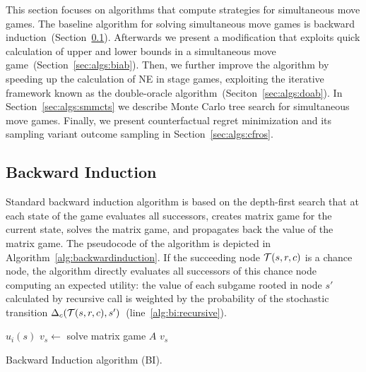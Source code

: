 
This section focuses on algorithms that compute strategies for simultaneous move games. 
The baseline algorithm for solving simultaneous move games is backward induction~(Section~\ref{sec:algs:bi}).
Afterwards we present a modification that exploits quick calculation of upper and lower bounds in a simultaneous move game~(Section~\ref{sec:algs:biab}).
Then, we further improve the algorithm by speeding up the calculation of NE in stage games, exploiting the iterative framework known as the double-oracle algorithm~(Seciton~\ref{sec:algs:doab}).
In Section~\ref{sec:algs:smmcts} we describe Monte Carlo tree search for simultaneous move games. 
Finally, we present counterfactual regret minimization and its sampling variant outcome sampling in Section~\ref{sec:algs:cfros}. 


\subsection{Backward Induction}\label{sec:algs:bi}

Standard backward induction algorithm is based on the depth-first search that at each state of the game evaluates all successors, creates matrix game for the current state, solves the matrix game, and propagates back the value of the matrix game. The pseudocode of the algorithm is depicted in Algorithm~\ref{alg:backwardinduction}. If the succeeding node $\mathcal{T}(s,r,c)$ is a chance node, the algorithm directly evaluates all successors of this chance node computing an expected utility: the value of each subgame rooted in node $s'$ calculated by recursive call is weighted by the probability of the stochastic transition $\Delta_c(\mathcal{T}(s,r,c),s')$~(line~\ref{alg:bi:recursive}).

\begin{algorithm2e}[t]
\small
{}
 {\Return $u_i(s)$} \label{alg:bi:stop1}
$v_s \leftarrow$ solve matrix game $A$\;
\Return $v_s$ \label{alg:bi:stop2}
\caption{Backward Induction algorithm (BI).}\label{alg:backwardinduction}
\end{algorithm2e}


